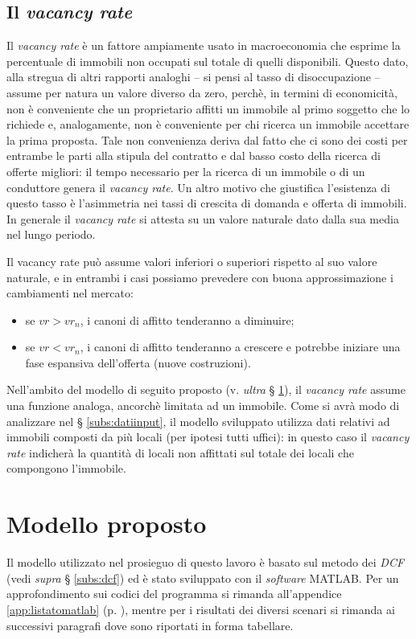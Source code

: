 \subsection{Il {\itshape vacancy rate}}
\label{subs:vacancyrate}
Il {\itshape vacancy rate} è un fattore ampiamente usato in macroeconomia che esprime la percentuale di immobili non occupati sul totale di quelli disponibili. Questo dato, alla stregua di altri rapporti analoghi -- si pensi al tasso di disoccupazione -- assume per natura un valore diverso da zero, perchè, in termini di economicità, non è conveniente che un proprietario affitti un immobile al primo soggetto che lo richiede e, analogamente, non è conveniente per chi ricerca un immobile accettare la prima proposta. Tale non convenienza deriva dal fatto che ci sono dei costi per entrambe le parti alla stipula del contratto e dal basso costo della ricerca di offerte migliori: il tempo necessario per la ricerca di un immobile o di un conduttore genera il {\itshape vacancy rate}. Un altro motivo che giustifica l'esistenza di questo tasso è l'asimmetria nei tassi di crescita di domanda e offerta di immobili.
In generale il {\itshape vacancy rate} si attesta su un valore naturale dato dalla sua media nel lungo periodo.

Il {\itshape} vacancy rate può assume valori inferiori o superiori rispetto al suo valore naturale, e in entrambi i casi possiamo prevedere con buona approssimazione i cambiamenti nel mercato:
\begin{itemize}
\item se $vr > vr_n$, i canoni di affitto tenderanno a diminuire;
\item se $vr < vr_n$, i canoni di affitto tenderanno a crescere e potrebbe iniziare una fase espansiva dell'offerta (nuove costruzioni).
\end{itemize}

Nell'ambito del modello di seguito proposto (v. \textit{ultra} § \ref{sec:modello}), il {\itshape vacancy rate} assume una funzione analoga, ancorchè limitata ad un immobile. Come si avrà modo di analizzare nel § \ref{subs:datiinput}, il modello sviluppato utilizza dati relativi ad immobili composti da più locali (per ipotesi tutti uffici): in questo caso il {\itshape vacancy rate} indicherà la quantità di locali non affittati sul totale dei locali che compongono l'immobile.


\section{Modello proposto}
\label{sec:modello}
Il modello utilizzato nel prosieguo di questo lavoro è basato sul metodo dei \textit{DCF} (vedi \textit{supra} § \ref{subs:dcf}) ed è stato sviluppato con il \textit{software} MATLAB. Per un approfondimento sui codici del programma si rimanda all'appendice \ref{app:listatomatlab} (p. \pageref{app:listatomatlab}), mentre per i risultati dei diversi scenari si rimanda ai successivi paragrafi dove sono riportati in forma tabellare.

